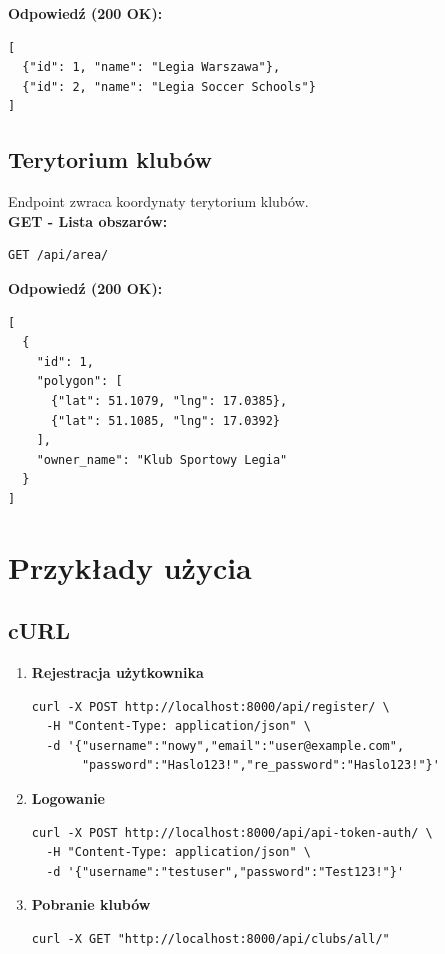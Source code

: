 \documentclass[a4paper,12pt]{article}
\begin{document}
\vspace{0.5cm}

\textbf{Odpowiedź (200 OK):}
\begin{lstlisting}
[
  {"id": 1, "name": "Legia Warszawa"},
  {"id": 2, "name": "Legia Soccer Schools"}
]
\end{lstlisting}

\newpage

\subsection{Terytorium klubów}

Endpoint zwraca koordynaty terytorium klubów. \\

\textbf{GET - Lista obszarów:}
\begin{lstlisting}
GET /api/area/
\end{lstlisting}

\vspace{0.5cm}

\textbf{Odpowiedź (200 OK):}
\begin{lstlisting}
[
  {
    "id": 1,
    "polygon": [
      {"lat": 51.1079, "lng": 17.0385},
      {"lat": 51.1085, "lng": 17.0392}
    ],
    "owner_name": "Klub Sportowy Legia"
  }
]
\end{lstlisting}

\newpage

\section{Przykłady użycia}

\subsection{cURL}

\begin{enumerate}[label=\textbf{\textbullet}]

\item \textbf{Rejestracja użytkownika}
\begin{lstlisting}
curl -X POST http://localhost:8000/api/register/ \
  -H "Content-Type: application/json" \
  -d '{"username":"nowy","email":"user@example.com",
       "password":"Haslo123!","re_password":"Haslo123!"}'
\end{lstlisting}

\item \textbf{Logowanie}
\begin{lstlisting}
curl -X POST http://localhost:8000/api/api-token-auth/ \
  -H "Content-Type: application/json" \
  -d '{"username":"testuser","password":"Test123!"}'
\end{lstlisting}

\item \textbf{Pobranie klubów}
\begin{lstlisting}
curl -X GET "http://localhost:8000/api/clubs/all/"
\end{lstlisting}

\end{enumerate}
\end{document}
